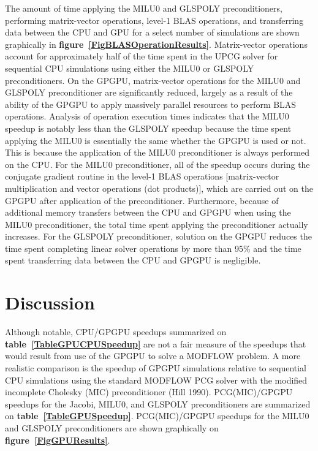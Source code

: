 \documentclass[12pt]{article}
\begin{document}
The amount of time applying the MILU0 and GLSPOLY preconditioners, performing matrix-vector operations, level-1 BLAS operations, and transferring data between the CPU and GPU for a select number of simulations are shown graphically in \textbf{figure~\ref{FigBLASOperationResults}}. Matrix-vector operations account for approximately half of the time spent in the UPCG solver for sequential CPU simulations using either the MILU0 or GLSPOLY preconditioners. On the GPGPU, matrix-vector operations for the MILU0 and GLSPOLY preconditioner are significantly reduced, largely as a result of the ability of the GPGPU to apply massively parallel resources to perform BLAS operations.  Analysis of operation execution times indicates that the MILU0 speedup is notably less than the GLSPOLY speedup because the time spent applying the MILU0 is essentially the same whether the GPGPU is used or not.  This is because the application of the MILU0 preconditioner is always performed on the CPU.  For the MILU0 preconditioner, all of the speedup occurs during the conjugate gradient routine in the level-1 BLAS operations [matrix-vector multiplication and vector operations (dot products)], which are carried out on the GPGPU after application of the preconditioner. Furthermore, because of additional memory transfers between the CPU and GPGPU when using the MILU0 preconditioner, the total time spent applying the preconditioner actually increases. For the GLSPOLY preconditioner, solution on the GPGPU reduces the time spent completing linear solver operations by more than 95\% and the time spent transferring data between the CPU and GPGPU is negligible.
 

\section* {\bf Discussion}
Although notable, CPU/GPGPU speedups summarized on \textbf{table~\ref{TableGPUCPUSpeedup}} are not a fair measure of the speedups that would result from use of the GPGPU to solve a MODFLOW problem. A more realistic comparison is the speedup of GPGPU simulations relative to sequential CPU simulations using the standard MODFLOW PCG solver with the modified incomplete Cholesky (MIC) preconditioner (Hill 1990). PCG(MIC)/GPGPU speedups for the Jacobi, MILU0, and GLSPOLY preconditioners are summarized on \textbf{table~\ref{TableGPUSpeedup}}.  PCG(MIC)/GPGPU speedups for the MILU0 and GLSPOLY preconditioners are shown graphically on \textbf{figure~\ref{FigGPUResults}}. 
\end{document}
